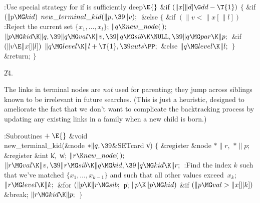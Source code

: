 \Y\B\4:Use special strategy for  if  is
sufficiently deep\X${}\E{}$\6
\&{if} ${}(\|x[\|d]\G\\{dd}-\T{1}){}$\5
${}\{{}$\1\6
\&{if} ${}(\|p\MG\\{kid}){}$\1\5
${}\\{new\_terminal\_kid}(\|p,\39\|v);{}$\2\6
\&{else}\5
${}\{{}$\1\6
\&{if} ${}(\|v<\|x[\|l]){}$\1\5
:Reject the current set $\{x_1,\ldots,x_l\}$\X;\2\6
${}\|q\K\\{new\_node}(\,);{}$\6
${}\|p\MG\\{kid}\K\|q,\39\|q\MG\\{val}\K\|v,\39\|q\MG\\{sib}\K\NULL,\39\|q\MG%
\\{par}\K\|p;{}$\6
\&{if} ${}(\|v\E\|x[\|l]){}$\1\5
${}\|q\MG\\{level}\K\|l+\T{1},\39\\{auts}\PP;{}$\2\6
\&{else}\1\5
${}\|q\MG\\{level}\K\|l;{}$\2\6
\4${}\}{}$\2\6
\&{return};\6
\4${}\}{}$\2\par
\U24.\fi

The  links in terminal nodes are {\it not%
\/} used for
parenting; they jump across siblings known to be irrelevant in future
searches. (This is just a heuristic, designed to ameliorate the fact
that we don't want to complicate the backtracking process by updating
any existing links in a family when a new child is born.)

\Y\B\4:Subroutines\X${}\mathrel+\E{}$\6
\&{void} \\{new\_terminal\_kid}(\&{node} ${}{*}\|q,\39{}$\&{SETcard} \|v)\1\1\2%
\2\6
${}\{{}$\1\6
\&{register} \&{node} ${}{*}\|r,{}$ ${}{*}\|p;{}$\6
\&{register} \&{int} \|k${},{}$ \|w;\7
${}\|r\K\\{new\_node}(\,);{}$\6
${}\|r\MG\\{val}\K\|v,\39\|r\MG\\{sib}\K\|q\MG\\{kid},\39\|q\MG\\{kid}\K\|r;{}$%
\6
:Find the index $k$ such that we've matched $\{x_1,\ldots,x_{k-1}\}$ and
such that all other values exceed~$x_k$\X;\6
${}\|r\MG\\{level}\K\|k;{}$\6
\&{for} ${}(\|p\K\|r\MG\\{sib};{}$ \|p; ${}\|p\K\|p\MG\\{kid}){}$\1\6
\&{if} ${}(\|p\MG\\{val}>\|x[\|k]){}$\1\5
\&{break};\2\2\6
${}\|r\MG\\{kid}\K\|p;{}$\6
\4${}\}{}$\2\par
\fi

